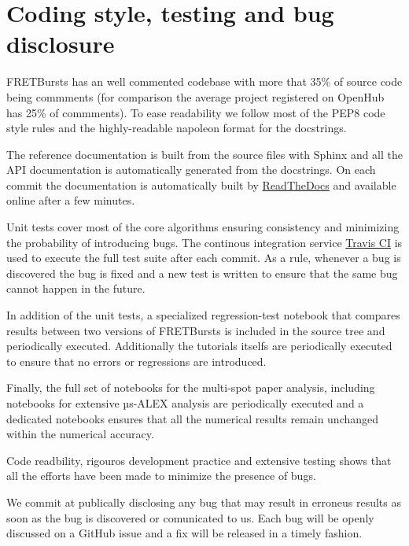 \section{Coding style, testing and bug disclosure}

FRETBursts has an well commented codebase with more that 35\% of source code
being commments (for comparison the average project registered on OpenHub has 25\%
of commments). To ease readability we follow most of the PEP8 code style rules and the highly-readable napoleon format for the docstrings.

The reference documentation is built from the source files with Sphinx and
all the API documentation is automatically generated from the docstrings.
On each commit the documentation is automatically built by 
\href{https://readthedocs.org/}{ReadTheDocs}
and available online after a few minutes.

Unit tests cover most of the core algorithms ensuring consistency and 
minimizing the probability of introducing bugs. The continous integration
service \href{http://travis-ci.org}{Travis CI} is used to execute the full
test suite after each commit.
As a rule, whenever a bug is discovered the bug is fixed and a new test is 
written to ensure that the same bug cannot happen in the future.

In addition of the unit tests, a specialized regression-test notebook
that compares results between two versions of FRETBursts is
included in the source tree and periodically executed. Additionally
the tutorials itselfs are periodically executed to ensure that
no errors or regressions are introduced.

Finally, the full set of notebooks for the multi-spot paper analysis,
including notebooks for extensive µs-ALEX analysis are periodically
executed and a dedicated notebooks ensures that all the numerical
results remain unchanged within the numerical accuracy.

Code readbility, rigouros development practice and extensive testing
shows that all the efforts have been made to minimize the presence 
of bugs.

We commit at publically disclosing any bug that may result in erroneus results 
as soon as the bug is discovered or comunicated to us.
Each bug will be openly discussed on a GitHub issue and a fix will be released 
in a timely fashion.
